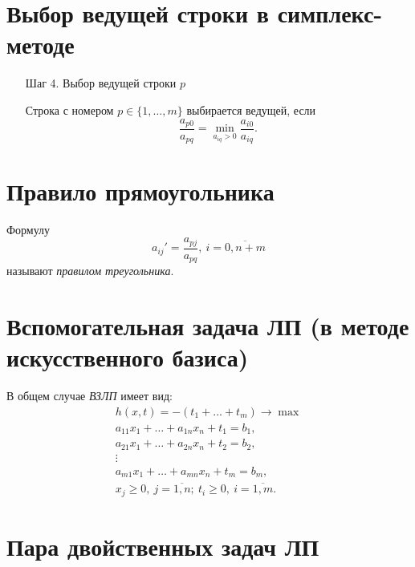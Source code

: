 \section{Выбор ведущей строки в симплекс-методе}

\begin{enumerate}
	\item[Шаг 4.] Выбор ведущей строки $p$

	      Строка с номером $p \in \{1,\ldots,m\}$ выбирается ведущей, если
	      \[
		      \frac{a_{p0}}{a_{pq}} = \underset{a_{iq} > 0}{\min}\frac{a_{i0}}{a_{iq}}.
	      \]
\end{enumerate}

\section{Правило прямоугольника}

\begin{definition}
	Формулу
	\[
		a_{ij}' = \frac{a_{pj}}{a_{pq}}, \ i = \overline{0,n+m}
	\]
	называют \emph{правилом треугольника}.
\end{definition}

\section{Вспомогательная задача ЛП (в методе искусственного базиса)}

\begin{definition}
	В общем случае \emph{ВЗЛП} имеет вид:
	\[
		\begin{array}{l}
			h(x,t) = -(t_1 + \ldots + t_m) \rightarrow \max \\
			a_{11}x_1 + \ldots + a_{1n}x_n + t_1 = b_1,     \\
			a_{21}x_1 + \ldots + a_{2n}x_n + t_2 = b_2,     \\
			\vdots                                          \\
			a_{m1}x_1 + \ldots + a_{mn}x_n + t_m = b_m,     \\
			x_j \geqslant 0, \ j = \overline{1,n}; \ t_i \geqslant 0, \ i = \overline{1,m}.
		\end{array}
	\]
\end{definition}

\section{Пара двойственных задач ЛП}

